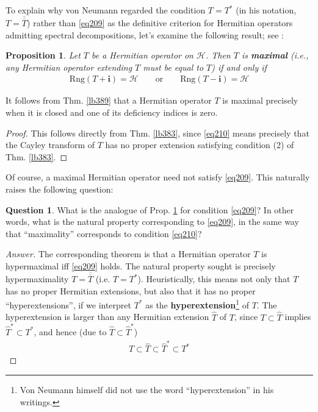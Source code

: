 \documentclass[12pt,b5paper,notitlepage]{article}
\theoremstyle{definition}
\newtheorem{question}[df]{Question}
\theoremstyle{plain}
\newtheorem{pp}[df]{Proposition}
\newcommand{\wht}{\widehat}
\newcommand{\ovl}{\overline}
\newcommand{\im}{\mathbf{i}}
\newcommand{\Rng}{\mathrm{Rng}}
\newcommand{\MH}{\mathcal H}
\numberwithin{equation}{section}
\begin{document}
To explain why von Neumann regarded the condition $T=T^*$ (in his notation, $T=\ovl{\ovl T}$) rather than \eqref{eq209} as the definitive criterion for Hermitian operators admitting spectral decompositions, let's examine the following result; see \cite[Satz 33]{vN29a}:

\begin{pp}\label{lb410}
Let $T$ be a Hermitian operator on $\MH$. Then $T$ is \textbf{maximal}  (i.e., any Hermitian operator extending $T$ must be equal to $T$) if and only if
\begin{align}\label{eq210}
\Rng(T+\im)=\MH\qquad\text{or}\qquad\Rng(T-\im)=\MH
\end{align}
\end{pp}

It follows from Thm. \ref{lb389} that a Hermitian operator $T$ is maximal precisely when it is closed and one of its deficiency indices is zero.

\begin{proof}
This follows directly from Thm. \ref{lb383}, since \eqref{eq210} means precisely that the Cayley transform of $T$ has no proper extension satisfying condition (2) of Thm. \ref{lb383}.
\end{proof}


Of course, a maximal Hermitian operator need not satisfy \eqref{eq209}. This naturally raises the following question:

\begin{question}
What is the analogue of Prop. \ref{lb410} for condition \eqref{eq209}? In other words, what is the natural property corresponding to \eqref{eq209}, in the same way that ``maximality'' corresponds to condition \eqref{eq210}?
\end{question}

\begin{proof}[Answer]
The corresponding theorem is that a Hermitian operator $T$ is hypermaximal iff \eqref{eq209} holds. The natural property sought is precisely hypermaximality $T=\ovl{\ovl T}$ (i.e. $T=T^*$). Heuristically, this means not only that $T$ has no proper Hermitian extensions, but also that it has no proper ``hyperextensions'', if we interpret $T^*$ as the \textbf{hyperextension}\footnote{Von Neumann himself did not use the word ``hyperextension'' in his writings.} of $T$. The hyperextension is larger than any Hermitian extension $\wht T$ of $T$, since $T\subset\wht T$ implies $\wht T^*\subset T^*$, and hence (due to $\wht T\subset\wht T^*$)
\begin{align}
T\subset\wht T\subset\wht T^*\subset T^*
\end{align}
\end{proof}
\end{document}

